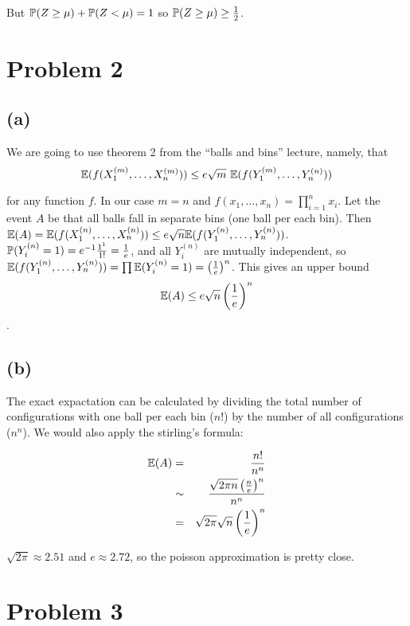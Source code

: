 \documentclass[a4paper]{article}
\begin{document}
But $ \P(Z \ge \mu) + \P(Z < \mu) = 1 $ so $ \P(Z \ge \mu) \ge \frac{1}{2} $.

\section*{Problem 2}

\subsection*{(a)}

We are going to use theorem 2 from the ``balls and bins'' lecture, namely, that
\[
  \E(f(X_1^{(m)}, \dots, X_n^{(m)})) \le e\sqrt{m}\ \E(f(Y_1^{(m)}, \dots, Y_n^{(n)}))
\]

for any function $ f $. In our case $ m = n $ and $ f(x_1, \dots, x_n) =
\prod_{i=1}^{n} x_i $. Let the event $ A $ be that all balls fall in separate
bins (one ball per each bin). Then $ \E(A) = \E(f(X_1^{(n)}, \dots, X_n^{(n)}))
\le e\sqrt{n} \E(f(Y_1^{(n)}, \dots, Y_n^{(n)})) $. $ \P(Y_i^{(n)} = 1) =
e^{-1}\frac{1^1}{1!} = \frac{1}{e} $, and all $ Y_i^{(n)} $ are mutually
independent, so $ \E(f(Y_1^{(n)}, \dots, Y_n^{(n)})) = \prod \E(Y_i^{(n)} = 1)
= \B{\frac{1}{e}}^{n} $. This gives an upper bound \[ \E(A) \le e\sqrt{n}
\bfrac{1}{e}^n \].

\subsection*{(b)}

The exact expactation can be calculated by dividing the total number of configurations with one ball per each bin ($ n! $) by the number of all configurations ($ n^n $). We would also apply the stirling's formula:

\begin{eqnarray*}
\E(A)
  &=& \frac{n!}{n^n} \\
  &\sim& \frac{\sqrt{2\pi n}\bfrac{n}{e}^n}{n^n} \\
  &=& \sqrt{2\pi} \sqrt{n} \bfrac{1}{e}^n \\
\end{eqnarray*}

$ \sqrt{2\pi} \approx 2.51 $ and $ e \approx 2.72 $, so the poisson approximation is pretty close.

\section*{Problem 3}
\end{document}
